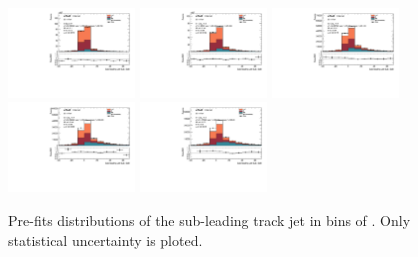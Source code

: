 \begin{figure}[htbp]
  \centering
 \includegraphics[width=0.3\textwidth]{figures/gbb/Sub_Sd0_Fits/Canv_PreFit_0-Zp_T-01_LpT_INF_SpT_INF_coarse_y.pdf}
 \includegraphics[width=0.3\textwidth]{figures/gbb/Sub_Sd0_Fits/Canv_PreFit_01-Zp_T-02_LpT_INF_SpT_INF_coarse_y.pdf}
 \includegraphics[width=0.3\textwidth]{figures/gbb/Sub_Sd0_Fits/Canv_PreFit_02-Zp_T-03_LpT_INF_SpT_INF_coarse_y.pdf}\\
 \includegraphics[width=0.3\textwidth]{figures/gbb/Sub_Sd0_Fits/Canv_PreFit_03-Zp_T-04_LpT_INF_SpT_INF_coarse_y.pdf}
 \includegraphics[width=0.3\textwidth]{figures/gbb/Sub_Sd0_Fits/Canv_PreFit_04-Zp_T-05_LpT_INF_SpT_INF_coarse_y.pdf}

\caption{Pre-fits \subsdzero distributions of the sub-leading track jet in bins of \zpt. Only statistical uncertainty is ploted.}
  \label{fig:ZpT-prefits-subleading-sub}
\end{figure}

